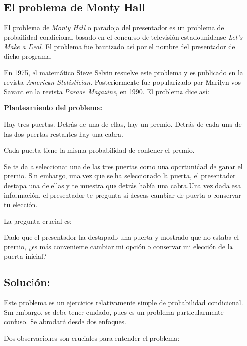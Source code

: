 \subsection{El problema de Monty Hall}

El problema de \textit{Monty Hall} o paradoja del presentador es un problema de
probailidad condicional basado en el concurso de televisi\'on estadounidense
\textit{Let's Make a Deal}. El problema fue bautizado as\'i por el nombre del
presentador de dicho programa.

En 1975, el matem\'atico Steve Selvin resuelve este problema y es publicado en
la revista \textit{American Statistician}. Posteriormente fue popularizado por
Marilyn vos Savant en la revista \textit{Parade Magazine}, en 1990. El problema
dice as\'i:

\textbf{Planteamiento del problema:}

Hay tres puertas. Detr\'as de una de ellas, hay un premio. Detr\'as de cada una
de las dos puertas restantes hay una cabra.

Cada puerta tiene la misma probabilidad de contener el premio.

Se te da a seleccionar una de las tres puertas como una oportunidad de ganar el
premio. Sin embargo, una vez que se ha seleccionado la puerta, el presentador
destapa una de ellas y te muestra que detrás hab\'ia una cabra.Una vez dada esa
informaci\'on, el presentador te pregunta si deseas cambiar de puerta o
conservar tu elecci\'on.

La pregunta crucial es:

Dado que el presentador ha destapado una puerta y mostrado que no estaba el
premio, ¿es m\'as conveniente cambiar mi opci\'on o conservar mi elecci\'on de
la puerta inicial?


\subsection*{Soluci\'on:}
Este problema es un ejercicios relativamente simple de probabilidad condicional.
Sin embargo, se debe tener cuidado, pues es un problema particularmente confuso.
Se abrodará desde dos enfoques.

Dos observaciones son cruciales para entender el problema:

